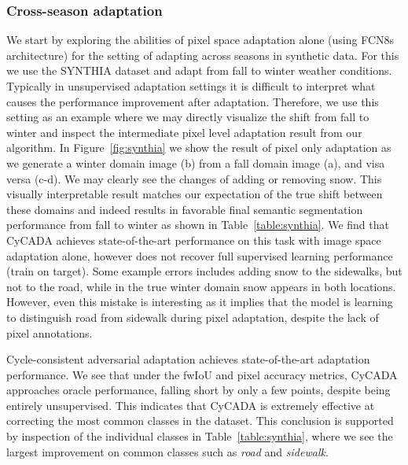 \newcommand{\myw}{3.5cm}
\newcommand{\myh}{1.8cm}
\subsubsection{Cross-season adaptation}

We start by exploring the abilities of pixel space adaptation alone (using FCN8s architecture) for the setting of adapting across seasons in synthetic data. For this we use the SYNTHIA dataset and adapt from fall to winter weather conditions. 
Typically in unsupervised adaptation settings it is difficult to interpret what causes the performance improvement after adaptation.
Therefore, we use this setting as an example where we may directly visualize the shift from fall to winter and inspect the intermediate pixel level adaptation result from our algorithm.
In Figure~\ref{fig:synthia} we show the result of pixel only adaptation as we generate a winter domain image (b) from a fall domain image (a), and visa versa (c-d). We may clearly see the changes of adding or removing snow. This visually interpretable result matches our expectation of the true shift between these domains and indeed results in favorable final semantic segmentation performance from fall to winter as shown in Table~\ref{table:synthia}. We find that CyCADA achieves state-of-the-art performance on this task with image space adaptation alone, however does not recover full supervised learning performance (train on target). Some example errors includes adding snow to the sidewalks, but not to the road, while in the true winter domain snow appears in both locations. However, even this mistake is interesting as it implies that the model is learning to distinguish road from sidewalk during pixel adaptation, despite the lack of pixel annotations.



Cycle-consistent adversarial adaptation achieves state-of-the-art adaptation performance.
We see that under the fwIoU and pixel accuracy metrics, CyCADA approaches oracle performance, falling short by only a few points, despite being entirely unsupervised.
This indicates that CyCADA is extremely effective at correcting the most common classes in the dataset.
This conclusion is supported by inspection of the individual classes in Table~\ref{table:synthia}, where we see the largest improvement on common classes such as \emph{road} and \emph{sidewalk}.




